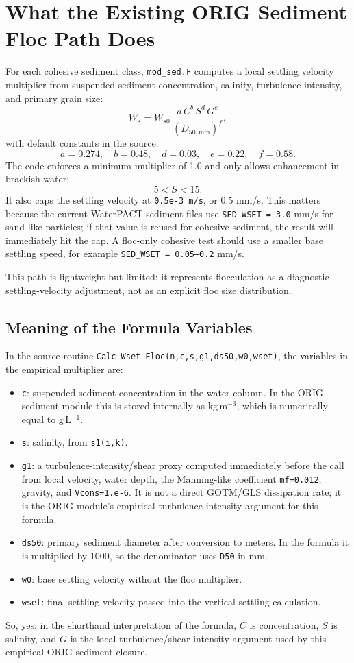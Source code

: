 \documentclass[11pt]{article}
\begin{document}
\section*{What the Existing ORIG Sediment Floc Path Does}

For each cohesive sediment class, \texttt{mod\_sed.F} computes a local settling
velocity multiplier from suspended sediment concentration, salinity, turbulence
intensity, and primary grain size:
\[
  W_s = W_{s0}\,
        \frac{a\,C^b\,S^d\,G^e}{(D_{50,\mathrm{mm}})^f},
\]
with default constants in the source:
\[
  a=0.274,\quad b=0.48,\quad d=0.03,\quad e=0.22,\quad f=0.58.
\]
The code enforces a minimum multiplier of 1.0 and only allows enhancement in
brackish water:
\[
  5 < S < 15.
\]
It also caps the settling velocity at \texttt{0.5e-3 m/s}, or
0.5 mm/s.  This matters because the current WaterPACT sediment files use
\texttt{SED\_WSET = 3.0} mm/s for sand-like particles; if that value is reused
for cohesive sediment, the result will immediately hit the cap.  A floc-only
cohesive test should use a smaller base settling speed, for example
\texttt{SED\_WSET = 0.05--0.2} mm/s.

This path is lightweight but limited: it represents flocculation as a
diagnostic settling-velocity adjustment, not as an explicit floc size
distribution.

\subsection*{Meaning of the Formula Variables}

In the source routine \texttt{Calc\_Wset\_Floc(n,c,s,g1,ds50,w0,wset)}, the
variables in the empirical multiplier are:
\begin{itemize}
  \item \texttt{c}: suspended sediment concentration in the water column.  In
        the ORIG sediment module this is stored internally as kg\,m$^{-3}$,
        which is numerically equal to g\,L$^{-1}$.
  \item \texttt{s}: salinity, from \texttt{s1(i,k)}.
  \item \texttt{g1}: a turbulence-intensity/shear proxy computed immediately
        before the call from local velocity, water depth, the Manning-like
        coefficient \texttt{mf=0.012}, gravity, and \texttt{Vcons=1.e-6}.  It
        is not a direct GOTM/GLS dissipation rate; it is the ORIG module's
        empirical turbulence-intensity argument for this formula.
  \item \texttt{ds50}: primary sediment diameter after conversion to meters.
        In the formula it is multiplied by 1000, so the denominator uses
        \texttt{D50} in mm.
  \item \texttt{w0}: base settling velocity without the floc multiplier.
  \item \texttt{wset}: final settling velocity passed into the vertical
        settling calculation.
\end{itemize}
So, yes: in the shorthand interpretation of the formula, \(C\) is concentration,
\(S\) is salinity, and \(G\) is the local turbulence/shear-intensity argument
used by this empirical ORIG sediment closure.
\end{document}

